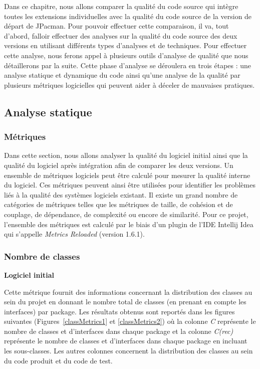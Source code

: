 \documentclass[12pt, openany]{report}
\begin{document}
Dans ce chapitre, nous allons comparer la qualité du code source qui intègre toutes les extensions individuelles avec la qualité du code source de la version de départ de JPacman. Pour pouvoir effectuer cette comparaison, il va, tout d'abord, falloir effectuer des analyses sur la qualité du code source des deux versions en utilisant différents types d'analyses et de techniques. Pour effectuer cette analyse, nous ferons appel à plusieurs outils d'analyse de qualité que nous détaillerons par la suite. Cette phase d'analyse se déroulera en trois étapes : une analyse statique et dynamique du code ainsi qu'une analyse de la qualité par plusieurs métriques logicielles qui peuvent aider à déceler de mauvaises pratiques. 

\subsection{Analyse statique}

\subsubsection{Métriques}

Dans cette section, nous allons analyser la qualité du logiciel initial ainsi que la qualité du logiciel après intégration afin de comparer les deux versions. Un ensemble de métriques logiciels peut être calculé pour mesurer la qualité interne du logiciel. Ces métriques peuvent ainsi être utilisées pour identifier les problèmes liés à la qualité des systèmes logiciels existant. Il existe un grand nombre de catégories de métriques telles que les métriques de taille, de cohésion et de couplage, de dépendance, de complexité ou encore de similarité. Pour ce projet, l'ensemble des métriques est calculé par le biais d'un plugin de l'IDE Intellij Idea qui s'appelle \textit{Metrics Reloaded} (version 1.6.1). 

\subsubsection*{Nombre de classes}


\textbf{Logiciel initial}


Cette métrique fournit des informations concernant la distribution des classes au sein du projet en donnant le nombre total de classes (en prenant en compte les interfaces) par package. Les résultats obtenus sont reportés dans les figures suivantes (Figures~\ref{classMetrics1} et \ref{classMetrics2}) où la colonne \textit{C} représente le nombre de classes et d'interfaces dans chaque package et la colonne \textit{C(rec)} représente le nombre de classes et d'interfaces dans chaque package en incluant les sous-classes. Les autres colonnes concernent la distribution des classes au sein du code produit et du code de test.
\end{document}
